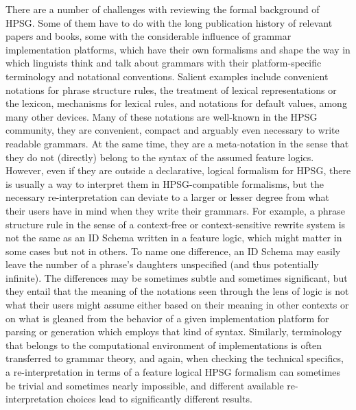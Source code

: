 \documentclass[output=paper
                ,modfonts
                ,nonflat
	        ,collection
	        ,collectionchapter
	        ,collectiontoclongg
 	        ,biblatex
                ,babelshorthands
                ,newtxmath
                ,draftmode
                ,colorlinks, citecolor=brown
]{./langsci/langscibook}
\begin{document}
{There are a number of challenges with reviewing the formal background
of HPSG. Some of them have to do with the long publication history of relevant papers and books, some
with the considerable influence of grammar implementation platforms, which have
their own formalisms and shape the way in which
linguists think and talk about grammars with their platform-specific terminology
and notational conventions. %
Salient examples include convenient
notations for phrase structure rules, the treatment of lexical
representations or the lexicon, mechanisms for lexical rules, and
notations for default values, among many other devices.  Many of these
notations are well-known in the HPSG community, they are convenient,
compact and arguably even necessary to write readable grammars. At
the same time, they are
a meta-notation in the sense that they
do not (directly) belong to the syntax of the assumed feature logics.
However, even if they are outside a declarative, logical formalism for HPSG,
there is usually a way to
interpret them in HPSG-compatible formalisms, but the necessary
re-interpretation can deviate to a larger or lesser degree from
what their users have in mind when they write their grammars. For example,
a phrase structure rule in the sense of a context-free or context-sensitive
rewrite system is not the same as an ID Schema written in a feature logic, which
might matter in some cases but not in others. To name one difference,
an ID Schema may easily leave the number of a phrase's daughters unspecified (and
thus potentially infinite).
The differences may be sometimes subtle and sometimes significant, but
they entail that the meaning of the notations seen through the lens
of logic is not what their users might assume either
based on their meaning in other contexts or on what is gleaned 
from the behavior
of a given implementation platform for parsing or generation which
employs that kind of syntax.
Similarly, terminology that belongs to the computational environment
of implementations is often transferred to grammar theory, and
again, when checking the technical specifics, a re-interpretation in terms of a feature logical HPSG
formalism can sometimes be trivial and sometimes nearly impossible,
and different available re-interpretation choices
lead to significantly different results.

}
\end{document}
